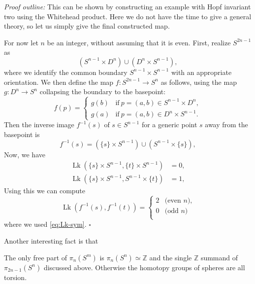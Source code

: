 \documentclass[12pt]{article}
\numberwithin{equation}{section}
\numberwithin{figure}{section}
\theoremstyle{remark}
\renewenvironment{proof}{\noindent\textsl{Proof outline:}}{\hfill$\square$}
\def\bZ{\mathbb{Z}}
\def\Lk{\mathop{\mathrm{Lk}}}
\begin{document}
\begin{proof}
This can be shown by constructing an example with Hopf invariant two using the Whitehead product.
Here we do not have the time to give a general theory, so let us simply give the final constructed map.

For now let $n$ be an integer, without assuming that it is even.
First, realize $S^{2n-1}$ as \begin{equation}
(S^{n-1} \times D^n) \cup (D^n \times S^{n-1}), 
\end{equation} where we identify the common boundary $S^{n-1}\times S^{n-1}$ with an appropriate orientation. 
We then define the map $f:S^{2n-1}\to S^n$ as follows,
using the map $g:D^n \to S^n$ collapsing the boundary to the basepoint:
\begin{equation}
f(p) = \begin{cases}
g(b) & \text{if}\ p=(a,b) \in S^{n-1}\times D^n ,\\
g(a) & \text{if}\ p=(a,b) \in D^{n}\times S^{n-1}.
\end{cases}
\end{equation}
Then the inverse image $f^{-1}(s)$ of $s\in S^{n-1}$ for a generic point $s$ away from the basepoint is  \begin{equation}
f^{-1}(s)= (\{s\} \times S^{n-1} ) \cup (S^{n-1} \times \{s\}),
\end{equation}
Now, we have \begin{align}
\Lk (\{s\} \times S^{n-1} ,\{t\} \times S^{n-1} )  &=0 ,\\
\Lk (\{s\} \times S^{n-1} ,S^{n-1}\times \{t\} )  &=1,
\end{align}
Using this we can compute \begin{equation}
\Lk (f^{-1}(s),f^{-1}(t)) = \begin{cases}
2 & \text{(even $n$),} \\
0 & \text{(odd $n$)} \\
\end{cases}
\end{equation}
where we used \eqref{eq:Lk-sym}.
\end{proof}



Another interesting fact is that 

\begin{theorem}
  The only free part of $\pi_n(S^m)$ is $\pi_n(S^n)\simeq \bZ$
  and the single $\bZ$ summand of $\pi_{2n-1}(S^n)$ discussed above.
  Otherwise the homotopy groups of spheres are all torsion.
\end{theorem}
  
\end{document}
